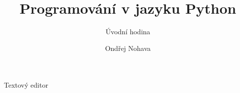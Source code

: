 \documentclass{beamer}
\title{Programování v jazyku Python}
\subtitle{Úvodní hodina}
\author{Ondřej Nohava}
\institute[DDMJH]{Dům dětí a mládeže Jindřichův Hradec}
\date{}
\begin{document}
\begin{frame}
\titlepage
\end{frame}

\begin{frame}[t]{Textový editor}


\end{frame}
\end{document}
